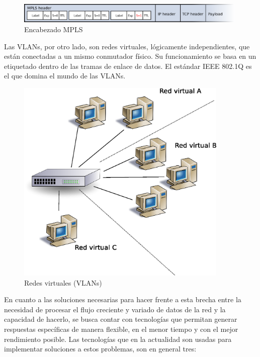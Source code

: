 \begin{figure}[h]
  \centering
	\includegraphics[width=0.99\textwidth]{1-introduccion/graf/MPLS_packet.eps}
  \caption{Encabezado MPLS}
  \label{fig:flow}
\end{figure}
Las VLANs, por otro lado, son redes virtuales, lógicamente independientes, que están conectadas a un mismo conmutador físico. Su funcionamiento se basa en un etiquetado dentro de las tramas de enlace de datos. El estándar IEEE 802.1Q es el que domina el mundo de las VLANs.
\begin{figure}[H]
  \centering
	\includegraphics[width=0.90\textwidth]{1-introduccion/graf/vlan.eps}
  \caption{Redes virtuales (VLANs)}
  \label{fig:virt}
\end{figure}

\newpage


En cuanto a las soluciones necesarias para hacer frente a esta brecha entre la necesidad de procesar el flujo creciente y variado de datos de la red y la capacidad de hacerlo, se busca contar con tecnologías que permitan generar respuestas específicas de manera flexible, en el menor tiempo y con el mejor rendimiento posible. Las tecnologías que en la actualidad son usadas para implementar soluciones a estos problemas, son en general tres:

